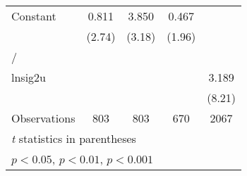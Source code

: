 {\begin{longtable}{l*{4}{c}}
Constant        &    0.811\sym{**} &    3.850\sym{**} &    0.467         &                  \\
                &   (2.74)         &   (3.18)         &   (1.96)         &                  \\
\hline
/               &                  &                  &                  &                  \\
lnsig2u         &                  &                  &                  &    3.189\sym{***}\\
                &                  &                  &                  &   (8.21)         \\
\hline
Observations    &      803         &      803         &      670         &     2067         \\
\hline\hline
\multicolumn{5}{l}{\footnotesize \textit{t} statistics in parentheses}\\
\multicolumn{5}{l}{\footnotesize \sym{*} \(p<0.05\), \sym{**} \(p<0.01\), \sym{***} \(p<0.001\)}\\
\end{longtable}
}
